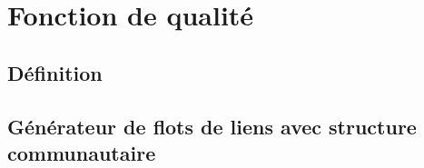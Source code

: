 \chapter{Fonction de qualité}
\section{Définition}
\section{Générateur de flots de liens avec structure communautaire}